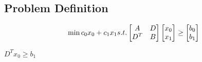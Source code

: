 \documentclass{llncs}
\begin{document}
\subsection{Problem Definition}
\begin{equation}
\min c_0x_0+c_1x_1\\
s.t. \begin{bmatrix}
A & D \\
D^T & B
\end{bmatrix}\begin{bmatrix}
 x_0\\
x_1
\end{bmatrix}\geq \begin{bmatrix}
b_0\\
b_1
\end{bmatrix}
\end{equation}

$D^Tx_0\geq b_1$




\end{document}
